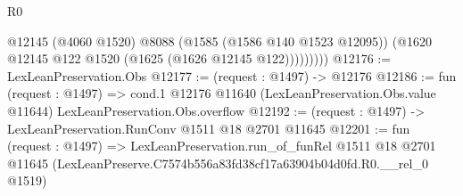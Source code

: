 \begin{lexlean}{R0}
\begin{coremodule}
                @12145
                (@4060 @1520)
                @8088
                (@1585 (@1586 @140 @1523 @12095))
                (@1620 @12145 @122 @1520 (@1625 (@1626 @12145 @122)))))))))
@12176 := LexLeanPreservation.Obs
@12177 := (request : @1497) -> @12176
@12186 := fun (request : @1497) =>
  cond.{1} @12176 @11640 (LexLeanPreservation.Obs.value @11644) LexLeanPreservation.Obs.overflow
@12192 := (request : @1497) -> LexLeanPreservation.RunConv @1511 @18 @2701 @11645
@12201 := fun (request : @1497) =>
  LexLeanPreservation.run_of_funRel
    @1511
    @18
    @2701
    @11645
    (LexLeanPreserve.C7574b556a83fd38cf17a63904b04d0fd.R0.__rel_0 @1519)
\end{coremodule}
\end{lexlean}
